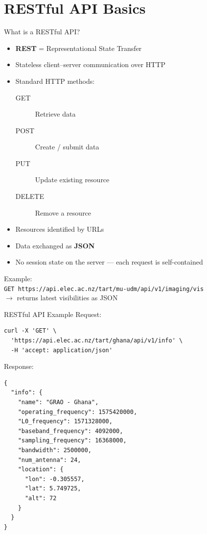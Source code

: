 \documentclass[ignorenonframetext]{beamer}
\begin{document}
\section{RESTful API Basics}

\begin{frame}{What is a RESTful API?}
	\begin{itemize}
		\item \textbf{REST} = Representational State Transfer
		\item Stateless client--server communication over HTTP
		\item Standard HTTP methods:
		      \begin{description}
			      \item[GET] Retrieve data
			      \item[POST] Create / submit data
			      \item[PUT] Update existing resource
			      \item[DELETE] Remove a resource
		      \end{description}
		\item Resources identified by URLs
		\item Data exchanged as \textbf{JSON}
		\item No session state on the server --- each request is self-contained
	\end{itemize}

	\vspace{0.3cm}
	{\small Example:}\\
	\texttt{GET https://api.elec.ac.nz/tart/mu-udm/api/v1/imaging/vis}\\
	{\scriptsize $\rightarrow$ returns latest visibilities as JSON}
\end{frame}

\begin{frame}[fragile]{RESTful API Example}
	{\small Request:}
	\begin{lstlisting}[basicstyle=\ttfamily\scriptsize\color{white}, backgroundcolor=\color{black!85}, rulecolor=\color{black!50}, frame=single, framesep=0.4em, xleftmargin=0.5em, xrightmargin=0.5em]
curl -X 'GET' \
  'https://api.elec.ac.nz/tart/ghana/api/v1/info' \
  -H 'accept: application/json'
	\end{lstlisting}

	\vspace{0.2cm}
	{\small Response:}
	\begin{lstlisting}[basicstyle=\ttfamily\scriptsize\color{black!85}, backgroundcolor=\color{gray!8}, rulecolor=\color{gray!40}, frame=single, framesep=0.4em, xleftmargin=0.5em, xrightmargin=0.5em]
{
  "info": {
    "name": "GRAO - Ghana",
    "operating_frequency": 1575420000,
    "L0_frequency": 1571328000,
    "baseband_frequency": 4092000,
    "sampling_frequency": 16368000,
    "bandwidth": 2500000,
    "num_antenna": 24,
    "location": {
      "lon": -0.305557,
      "lat": 5.749725,
      "alt": 72
    }
  }
}
	\end{lstlisting}
\end{frame}
\end{document}
